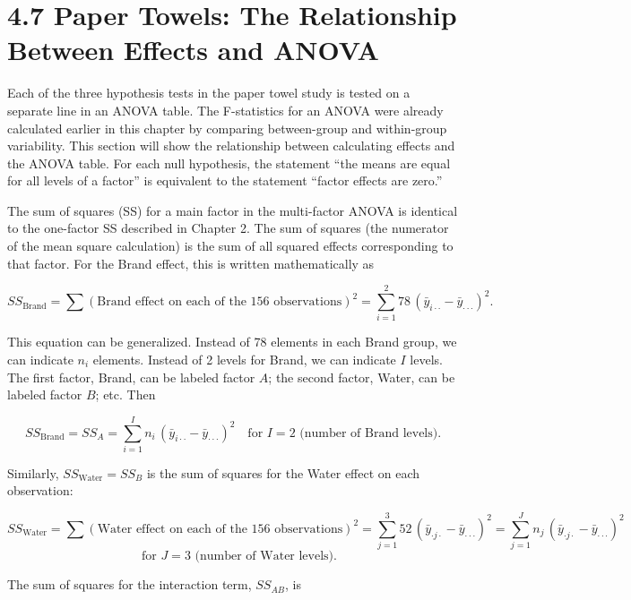 \documentclass[
]{report}
\theoremstyle{definition}
\theoremstyle{definition}
\theoremstyle{definition}
\theoremstyle{definition}
\theoremstyle{remark}
\begin{document}
\hypertarget{paper-towels-the-relationship-between-effects-and-anova}{%
\chapter{4.7 Paper Towels: The Relationship Between Effects and ANOVA}\label{paper-towels-the-relationship-between-effects-and-anova}}

Each of the three hypothesis tests in the paper towel study is tested on a separate line in an ANOVA table. The F-statistics for an ANOVA were already calculated earlier in this chapter by comparing between-group and within-group variability. This section will show the relationship between calculating effects and the ANOVA table. For each null hypothesis, the statement ``the means are equal for all levels of a factor'' is equivalent to the statement ``factor effects are zero.''

The sum of squares (SS) for a main factor in the multi-factor ANOVA is identical to the one-factor SS described in Chapter 2. The sum of squares (the numerator of the mean square calculation) is the sum of all squared effects corresponding to that factor. For the Brand effect, this is written mathematically as

\[
SS_{\text{Brand}}
= \sum (\text{Brand effect on each of the 156 observations})^2
= \sum_{i=1}^{2} 78\,(\bar y_{i\cdot\cdot} - \bar y_{\cdot\cdot\cdot})^2.
\tag{4.9}
\]

This equation can be generalized. Instead of 78 elements in each Brand group, we can indicate \(n_i\) elements. Instead of 2 levels for Brand, we can indicate \(I\) levels. The first factor, Brand, can be labeled factor \(A\); the second factor, Water, can be labeled factor \(B\); etc. Then

\[
SS_{\text{Brand}} = SS_A = \sum_{i=1}^{I} n_i \,(\bar y_{i\cdot\cdot} - \bar y_{\cdot\cdot\cdot})^2
\quad\text{for } I = 2 \text{ (number of Brand levels)}.
\]

Similarly, \(SS_{\text{Water}} = SS_B\) is the sum of squares for the Water effect on each observation:

\[
SS_{\text{Water}}
= \sum (\text{Water effect on each of the 156 observations})^2
= \sum_{j=1}^{3} 52\,(\bar y_{\cdot j \cdot} - \bar y_{\cdot\cdot\cdot})^2
= \sum_{j=1}^{J} n_j \,(\bar y_{\cdot j \cdot} - \bar y_{\cdot\cdot\cdot})^2
\]
\[
\quad\text{for } J = 3 \text{ (number of Water levels)}.
\tag{4.10}
\]

The sum of squares for the interaction term, \(SS_{AB}\), is
\end{document}
